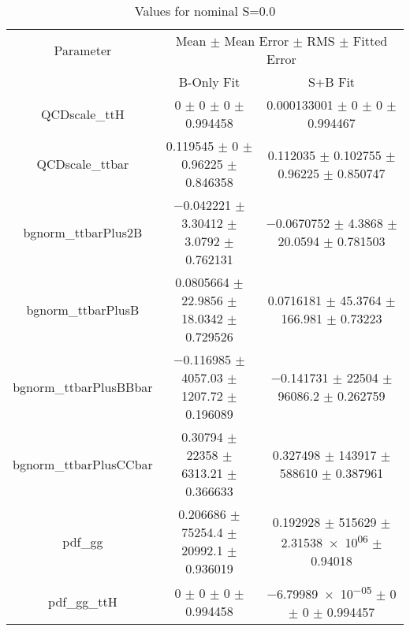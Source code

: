 \begin{table}
\centering
\caption{Values for nominal S=0.0}
\begin{tabular}{ccc}
\toprule
Parameter & \multicolumn{2}{c}{Mean $\pm$ Mean Error $\pm$ RMS $\pm$ Fitted Error}\\
 & B-Only Fit & S+B Fit\\
\midrule
QCDscale\_ttH & \num{0} $\pm$ \num{0} $\pm$ \num{0} $\pm$ \num{0.994458} & \num{0.000133001} $\pm$ \num{0} $\pm$ \num{0} $\pm$ \num{0.994467}\\
QCDscale\_ttbar & \num{0.119545} $\pm$ \num{0} $\pm$ \num{0.96225} $\pm$ \num{0.846358} & \num{0.112035} $\pm$ \num{0.102755} $\pm$ \num{0.96225} $\pm$ \num{0.850747}\\
bgnorm\_ttbarPlus2B & \num{-0.042221} $\pm$ \num{3.30412} $\pm$ \num{3.0792} $\pm$ \num{0.762131} & \num{-0.0670752} $\pm$ \num{4.3868} $\pm$ \num{20.0594} $\pm$ \num{0.781503}\\
bgnorm\_ttbarPlusB & \num{0.0805664} $\pm$ \num{22.9856} $\pm$ \num{18.0342} $\pm$ \num{0.729526} & \num{0.0716181} $\pm$ \num{45.3764} $\pm$ \num{166.981} $\pm$ \num{0.73223}\\
bgnorm\_ttbarPlusBBbar & \num{-0.116985} $\pm$ \num{4057.03} $\pm$ \num{1207.72} $\pm$ \num{0.196089} & \num{-0.141731} $\pm$ \num{22504} $\pm$ \num{96086.2} $\pm$ \num{0.262759}\\
bgnorm\_ttbarPlusCCbar & \num{0.30794} $\pm$ \num{22358} $\pm$ \num{6313.21} $\pm$ \num{0.366633} & \num{0.327498} $\pm$ \num{143917} $\pm$ \num{588610} $\pm$ \num{0.387961}\\
pdf\_gg & \num{0.206686} $\pm$ \num{75254.4} $\pm$ \num{20992.1} $\pm$ \num{0.936019} & \num{0.192928} $\pm$ \num{515629} $\pm$ \num{2.31538e+06} $\pm$ \num{0.94018}\\
pdf\_gg\_ttH & \num{0} $\pm$ \num{0} $\pm$ \num{0} $\pm$ \num{0.994458} & \num{-6.79989e-05} $\pm$ \num{0} $\pm$ \num{0} $\pm$ \num{0.994457}\\
\bottomrule
\end{tabular}
\end{table}